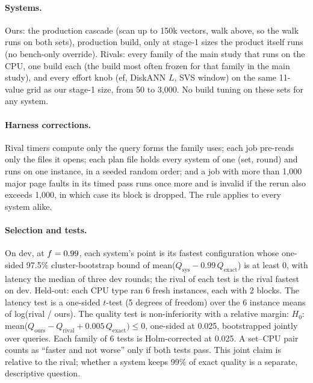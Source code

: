 \paragraph{Systems.} Ours: the production cascade (scan up to 150k vectors, walk above, so the walk runs on both sets),
production build, only at stage-1 sizes the product itself runs (no bench-only override). Rivals: every family of the
main study that runs on the CPU, one build each (the build most often frozen for that family in the main study), and
every effort knob (ef, DiskANN $L$, SVS window) on the same 11-value grid as our stage-1 size, from 50 to 3,000. No build
tuning on these sets for any system.

\paragraph{Harness corrections.} Rival timers compute only the query forms the family uses; each job pre-reads only the
files it opens; each plan file holds every system of one (set, round) and runs on one instance, in a seeded random order;
and a job with more than 1,000 major page faults in its timed pass runs once more and is invalid if the rerun also exceeds
1,000, in which case its block is dropped. The rule applies to every system alike.

\paragraph{Selection and tests.} On dev, at $f = 0.99$, each system's point is its fastest configuration whose
one-sided 97.5\% cluster-bootstrap bound of mean($Q_{\text{sys}} - 0.99\,Q_{\text{exact}}$) is at least 0, with latency the
median of three dev rounds; the rival of each test is the rival fastest on dev. Held-out: each CPU type ran 6 fresh
instances, each with 2 blocks. The latency test is a one-sided $t$-test (5 degrees of freedom) over the 6 instance means
of log(rival / ours). The quality test is non-inferiority with a relative margin: $H_0$: mean($Q_{\text{ours}} -
Q_{\text{rival}} + 0.005\,Q_{\text{exact}}) \le 0$, one-sided at 0.025, bootstrapped jointly over queries. Each family of 6
tests is Holm-corrected at 0.025. A set--CPU pair counts as ``faster and not worse'' only if both tests pass. This joint
claim is relative to the rival; whether a system keeps 99\% of exact quality is a separate, descriptive question.

